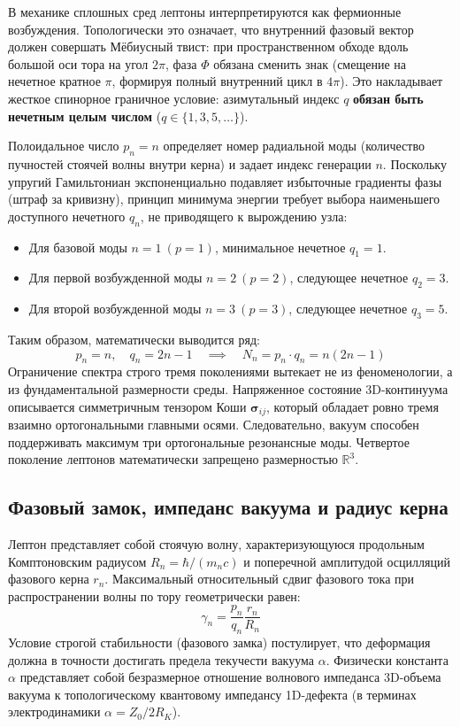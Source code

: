 \documentclass[12pt,a4paper]{article}
\begin{document}
	В механике сплошных сред лептоны интерпретируются как фермионные возбуждения. Топологически это означает, что внутренний фазовый вектор должен совершать Мёбиусный твист: при пространственном обходе вдоль большой оси тора на угол $2\pi$, фаза $\Phi$ обязана сменить знак (смещение на нечетное кратное $\pi$, формируя полный внутренний цикл в $4\pi$). Это накладывает жесткое спинорное граничное условие: азимутальный индекс $q$ \textbf{обязан быть нечетным целым числом} ($q \in \{1, 3, 5, \dots\}$).
	
	Полоидальное число $p_n = n$ определяет номер радиальной моды (количество пучностей стоячей волны внутри керна) и задает индекс генерации $n$. Поскольку упругий Гамильтониан экспоненциально подавляет избыточные градиенты фазы (штраф за кривизну), принцип минимума энергии требует выбора наименьшего доступного нечетного $q_n$, не приводящего к вырождению узла:
	\begin{itemize}
		\item Для базовой моды $n=1 \ (p=1)$, минимальное нечетное $q_1 = 1$.
		\item Для первой возбужденной моды $n=2 \ (p=2)$, следующее нечетное $q_2 = 3$.
		\item Для второй возбужденной моды $n=3 \ (p=3)$, следующее нечетное $q_3 = 5$.
	\end{itemize}
	Таким образом, математически выводится ряд:
	\begin{equation}
		p_n = n, \quad q_n = 2n - 1 \quad \implies \quad N_n = p_n \cdot q_n = n(2n-1)
	\end{equation}
	Ограничение спектра строго тремя поколениями вытекает не из феноменологии, а из фундаментальной размерности среды. Напряженное состояние 3D-континуума описывается симметричным тензором Коши $\boldsymbol{\sigma}_{ij}$, который обладает ровно тремя взаимно ортогональными главными осями. Следовательно, вакуум способен поддерживать максимум три ортогональные резонансные моды. Четвертое поколение лептонов математически запрещено размерностью $\mathbb{R}^3$.
	
	\subsection{Фазовый замок, импеданс вакуума и радиус керна}
	Лептон представляет собой стоячую волну, характеризующуюся продольным Комптоновским радиусом $R_n = \hbar / (m_n c)$ и поперечной амплитудой осцилляций фазового керна $r_n$. Максимальный относительный сдвиг фазового тока при распространении волны по тору геометрически равен:
	\begin{equation}
		\gamma_n = \frac{p_n}{q_n} \frac{r_n}{R_n}
	\end{equation}
	Условие строгой стабильности (фазового замка) постулирует, что деформация должна в точности достигать предела текучести вакуума $\alpha$. Физически константа $\alpha$ представляет собой безразмерное отношение волнового импеданса 3D-объема вакуума к топологическому квантовому импедансу 1D-дефекта (в терминах электродинамики $\alpha = Z_0 / 2R_K$). 
	
\end{document}
